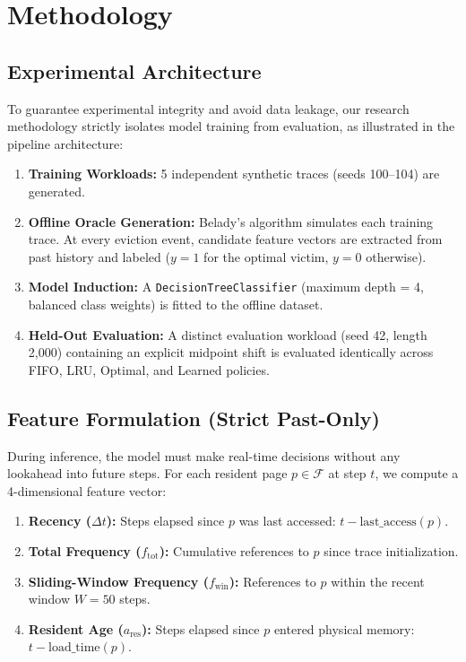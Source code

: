 \documentclass[10pt,twocolumn,a4paper]{article}
\begin{document}
\section{Methodology}
\subsection{Experimental Architecture}
To guarantee experimental integrity and avoid data leakage, our research methodology strictly isolates model training from evaluation, as illustrated in the pipeline architecture:
\begin{enumerate}
    \item \textbf{Training Workloads:} 5 independent synthetic traces (seeds 100--104) are generated.
    \item \textbf{Offline Oracle Generation:} Belady's algorithm simulates each training trace. At every eviction event, candidate feature vectors are extracted from past history and labeled ($y=1$ for the optimal victim, $y=0$ otherwise).
    \item \textbf{Model Induction:} A \texttt{DecisionTreeClassifier} (maximum depth = 4, balanced class weights) is fitted to the offline dataset.
    \item \textbf{Held-Out Evaluation:} A distinct evaluation workload (seed 42, length 2,000) containing an explicit midpoint shift is evaluated identically across FIFO, LRU, Optimal, and Learned policies.
\end{enumerate}

\subsection{Feature Formulation (Strict Past-Only)}
During inference, the model must make real-time decisions without any lookahead into future steps. For each resident page $p \in \mathcal{F}$ at step $t$, we compute a 4-dimensional feature vector:
\begin{enumerate}
    \item \textbf{Recency ($\Delta t$):} Steps elapsed since $p$ was last accessed: $t - \text{last\_access}(p)$.
    \item \textbf{Total Frequency ($f_{\text{tot}}$):} Cumulative references to $p$ since trace initialization.
    \item \textbf{Sliding-Window Frequency ($f_{\text{win}}$):} References to $p$ within the recent window $W = 50$ steps.
    \item \textbf{Resident Age ($a_{\text{res}}$):} Steps elapsed since $p$ entered physical memory: $t - \text{load\_time}(p)$.
\end{enumerate}
\end{document}
